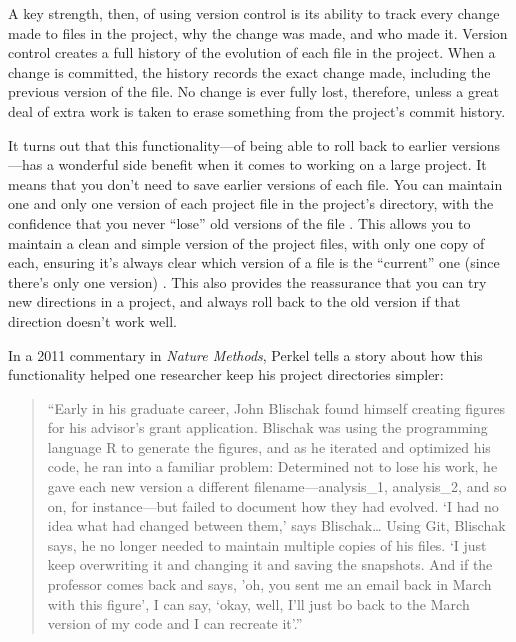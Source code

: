 \documentclass[]{tufte-book}
\begin{document}
A key strength, then, of using version control is its ability to track every
change made to files in the project, why the change was made, and who made it.
Version control creates a full history of the evolution of each file in the
project. When a change is committed, the history records the exact change made,
including the previous version of the file. No change is ever fully lost,
therefore, unless a great deal of extra work is taken to erase something from
the project's commit history.

It turns out that this functionality---of being able to roll back to earlier
versions---has a wonderful side benefit when it comes to working on a large
project. It means that you don't need to save earlier versions of each file. You
can maintain one and only one version of each project file in the project's
directory, with the confidence that you never ``lose'' old versions of the file
\citep{perkel2018git, blischak2016quick}. This allows you to maintain a clean and
simple version of the project files, with only one copy of each, ensuring it's
always clear which version of a file is the ``current'' one (since there's only
one version) \citep{klemens201421st}. This also provides the reassurance that you can
try new directions in a project, and always roll back to the old version if that
direction doesn't work well.

In a 2011 commentary in \emph{Nature Methods}, Perkel tells a story about how this
functionality helped one researcher keep his project directories simpler:

\begin{quote}
``Early in his graduate career, John Blischak found himself creating figures
for his advisor's grant application. Blischak was using the programming language
R to generate the figures, and as he iterated and optimized his code, he ran
into a familiar problem: Determined not to lose his work, he gave each new
version a different filename---analysis\_1, analysis\_2, and so on, for
instance---but failed to document how they had evolved. `I had no idea what had
changed between them,' says Blischak\ldots{} Using Git, Blischak says, he no longer
needed to maintain multiple copies of his files. `I just keep overwriting it and
changing it and saving the snapshots. And if the professor comes back and says,
'oh, you sent me an email back in March with this figure', I can say, `okay,
well, I'll just bo back to the March version of my code and I can recreate
it'.'' \citep{perkel2018git}
\end{quote}
\end{document}
